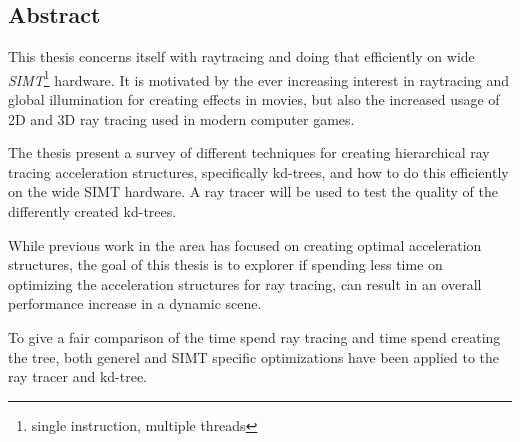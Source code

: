 

\begin{center}
\begin{minipage}{0.7\textwidth}
\section*{Abstract}

This thesis concerns itself with raytracing and doing that efficiently
on wide \textit{SIMT}\footnote{single instruction, multiple threads}
hardware. It is motivated by the ever increasing interest in
raytracing and global illumination for creating effects in movies, but
also the increased usage of 2D and 3D ray tracing used in modern
computer games.

The thesis present a survey of different techniques for creating
hierarchical ray tracing acceleration structures, specifically
kd-trees, and how to do this efficiently on the wide SIMT hardware. A
ray tracer will be used to test the quality of the differently created
kd-trees.

While previous work in the area has focused on creating optimal
acceleration structures, the goal of this thesis is to explorer if
spending less time on optimizing the acceleration structures for ray
tracing, can result in an overall performance increase in a dynamic
scene.

To give a fair comparison of the time spend ray tracing and time spend
creating the tree, both generel and SIMT specific optimizations have
been applied to the ray tracer and kd-tree.

\end{minipage}
\end{center}










